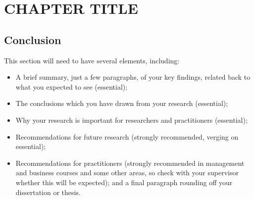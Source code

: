 \chapter{CHAPTER TITLE} \label{c7}
\section{Conclusion}
This section will need to have several elements, including:
\begin{itemize}
	\item A brief summary, just a few paragraphs, of your key findings, related back to what you expected to see (essential);
	\item The conclusions which you have drawn from your research (essential);
	\item Why your research is important for researchers and practitioners (essential);
	\item Recommendations for future research (strongly recommended, verging on essential);
	\item Recommendations for practitioners (strongly recommended in management and business courses and some other areas, so check with your supervisor whether this will be expected); and a final paragraph rounding off your dissertation or thesis.
\end{itemize}


